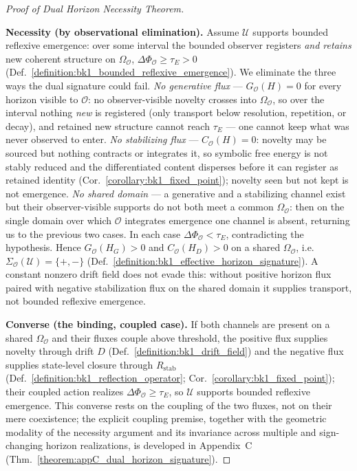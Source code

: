 \begin{proof}[Proof of Dual Horizon Necessity Theorem]
\label{proof:bk1_proof_of_dual_horizon_necessity_theorem}
\leavevmode

\textbf{Necessity (by observational elimination).}
Assume \(\mathcal{U}\) supports bounded reflexive emergence: over some interval
the bounded observer registers \emph{and retains} new coherent structure on
\(\Omega_{\mathcal{O}}\), \(\Delta\Phi_{\mathcal{O}}\ge\tau_E>0\)
(Def.~\ref{definition:bk1_bounded_reflexive_emergence}). We eliminate the three
ways the dual signature could fail.
\emph{No generative flux} --- \(G_{\mathcal{O}}(H)=0\) for every horizon visible
to \(\mathcal{O}\): no observer-visible novelty crosses into
\(\Omega_{\mathcal{O}}\), so over the interval nothing \emph{new} is registered
(only transport below resolution, repetition, or decay), and retained new
structure cannot reach \(\tau_E\) --- one cannot keep what was never observed to
enter.
\emph{No stabilizing flux} --- \(C_{\mathcal{O}}(H)=0\): novelty may be sourced
but nothing contracts or integrates it, so symbolic free energy is not stably
reduced and the differentiated content disperses before it can register as
retained identity (Cor.~\ref{corollary:bk1_fixed_point}); novelty seen but not
kept is not emergence.
\emph{No shared domain} --- a generative and a stabilizing channel exist but
their observer-visible supports do not both meet a common \(\Omega_{\mathcal{O}}\):
then on the single domain over which \(\mathcal{O}\) integrates emergence one
channel is absent, returning us to the previous two cases.
In each case \(\Delta\Phi_{\mathcal{O}}<\tau_E\), contradicting the hypothesis.
Hence \(G_{\mathcal{O}}(H_G)>0\) and \(C_{\mathcal{O}}(H_D)>0\) on a shared
\(\Omega_{\mathcal{O}}\), i.e.\ \(\Sigma_{\mathcal{O}}(\mathcal{U})=\{+,-\}\)
(Def.~\ref{definition:bk1_effective_horizon_signature}). A constant nonzero drift
field does not evade this: without positive horizon flux paired with negative
stabilization flux on the shared domain it supplies transport, not bounded
reflexive emergence.

\textbf{Converse (the binding, coupled case).}
If both channels are present on a shared \(\Omega_{\mathcal{O}}\) and their fluxes
couple above threshold, the positive flux supplies novelty through drift \(D\)
(Def.~\ref{definition:bk1_drift_field}) and the negative flux supplies state-level
closure through \(R_{\mathrm{stab}}\) (Def.~\ref{definition:bk1_reflection_operator};
Cor.~\ref{corollary:bk1_fixed_point}); their coupled action realizes
\(\Delta\Phi_{\mathcal{O}}\ge\tau_E\), so \(\mathcal{U}\) supports bounded
reflexive emergence. This converse rests on the coupling of the two fluxes, not on
their mere coexistence; the explicit coupling premise, together with the geometric
modality of the necessity argument and its invariance across multiple and
sign-changing horizon realizations, is developed in Appendix~C
(Thm.~\ref{theorem:appC_dual_horizon_signature}).
\end{proof}

